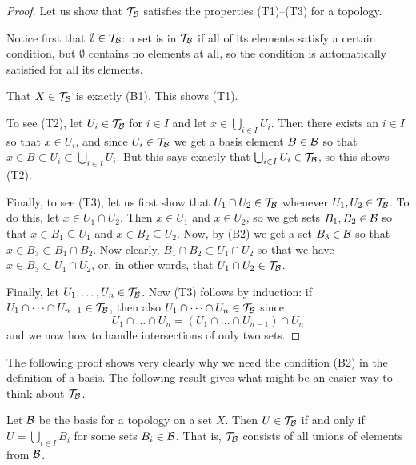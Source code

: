 \begin{proof}
  Let us show that $\mathcal{T}_{\mathcal{B}}$ satisfies the properties (T1)--(T3) for a topology.

  Notice first that $\emptyset \in \mathcal{T}_{\mathcal{B}}$: a set is in $\mathcal{T}_{\mathcal{B}}$ if all of its elements satisfy a certain condition, but $\emptyset$ contains no elements at all, so the condition is automatically satisfied for all its elements.
  
  That $X \in \mathcal{T}_{\mathcal{B}}$ is exactly (B1). This shows (T1).
  
  To see (T2), let $U_i \in \mathcal{T}_{\mathcal{B}}$ for $i \in I$ and let $x \in \bigcup_{i \in I} U_i$. Then there exists an $i \in I$ so that $x \in U_i$, and since $U_i \in \mathcal{T}_{\mathcal{B}}$ we get a basis element $B \in \mathcal{B}$ so that $x \in B \subset U_i \subset \bigcup_{i \in I} U_i$. But this says exactly that $\bigcup_{i \in I} U_i \in \mathcal{T}_{\mathcal{B}}$, so this shows (T2).
  
  Finally, to see (T3), let us first show that $U_1 \cap U_2 \in \mathcal{T}_{\mathcal{B}}$ whenever $U_1, U_2 \in \mathcal{T}_{\mathcal{B}}$. To do this, let $x \in U_1 \cap U_2$. Then $x \in U_1$ and $x \in U_2$, so we get sets $B_1, B_2 \in \mathcal{B}$ so that $x \in B_1 \subseteq U_1$ and $x \in B_2 \subseteq U_2$. Now, by (B2) we get a set $B_3 \in \mathcal{B}$ so that $x \in B_3 \subset B_1 \cap B_2$. Now clearly, $B_1 \cap B_2 \subset U_1 \cap U_2$ so that we have $x \in B_3 \subset U_1 \cap U_2$, or, in other words, that $U_1 \cap U_2 \in \mathcal{T}_{\mathcal{B}}$.
  
  Finally, let $U_1, \dots, U_n \in \mathcal{T}_{\mathcal{B}}$. Now (T3) follows by induction: if $U_1 \cap \dots \cap U_{n-1} \in \mathcal{T}_{\mathcal{B}}$, then also $U_1 \cap \dots \cap U_n \in \mathcal{T}_{\mathcal{B}}$ since
  \[
    U_1 \cap \dots \cap U_n = (U_1 \cap \dots \cap U_{n-1}) \cap U_n
  \]
  and we now how to handle intersections of only two sets.
\end{proof}
The following proof shows very clearly why we need the condition (B2) in the definition of a basis. The following result gives what might be an easier way to think about $\mathcal{T}_{\mathcal{B}}$.
\begin{lem}
  \label{genereated-by-unions}
  Let $\mathcal{B}$ be the basis for a topology on a set $X$. Then $U \in \mathcal{T}_{\mathcal{B}}$ if and only if $U = \bigcup_{i \in I} B_i$ for some sets $B_i \in \mathcal{B}$. That is, $\mathcal{T}_{\mathcal{B}}$ consists of all unions of elements from $\mathcal{B}$.
\end{lem}
